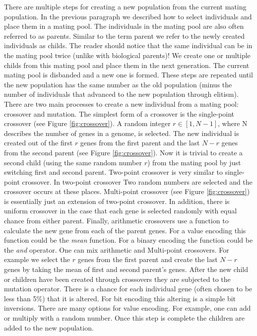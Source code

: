 There are multiple steps for creating a new population from the current mating population. In the previous paragraph we described how to select \glspl{individual} and place them in a mating pool. The \glspl{individual} in the mating pool are also often referred to as \glspl{parent}. Similar to the term \gls{parent} we refer to the newly created \glspl{individual} as \glspl{child}. The reader should notice that the same individual can be in the mating pool twice (unlike with biological \glspl{parent})! We create one or multiple \glspl{child} from this mating pool and place them in the next generation. The current mating pool is disbanded and a new one is formed. These steps are repeated until the new population has the same number as the old population (minus the number of individuals that advanced to the new population through \gls{elitism}). There are two main processes to create a new individual from a mating pool: \gls{crossover} and \gls{mutation}. The simplest form of a \gls{crossover} is the single-point \gls{crossover} (see Figure \ref{fig:crossover}). A random integer $r \in [1,N-1]$, where N describes the number of \glspl{gene} in a \gls{genome}, is selected. The new individual is created out of the first $r$ genes from the first parent and the last $N-r$ genes from the second parent (see Figure \ref{fig:crossover}). Now it is trivial to create a second child (using the same random number $r$) from the mating pool by just switching first and second \gls{parent}. 
Two-point \gls{crossover} is very similar to single-point crossover. In two-point \gls{crossover} Two random numbers are selected and the crossover occurs at these places. Multi-point \gls{crossover} (see Figure \ref{fig:crossover}) is essentially just an extension of two-point \gls{crossover}. In addition, there is uniform \gls{crossover} in the case that each gene is selected randomly with equal chance from either parent. Finally, arithmetic \glspl{crossover} use a function to calculate the new gene from each of the parent genes. For a value encoding this function could be the \emph{mean} function. For a binary encoding the function could be the \textit{and} operator. 
One can mix arithmetic and Multi-point  crossovers. For example we select the $r$ genes from the first parent and create the last $N-r$ genes by taking the mean of first and second parent's \glspl{gene}. After the new child or children have been created through \glspl{crossover} they are subjected to the mutation operator. There is a chance for each individual gene (often chosen to be less than 5\%) that it is altered. For bit encoding this altering is a simple bit inversions. There are many options for value encoding. For example, one can add or multiply with a random number. Once this step is complete the children are added to the new population.

